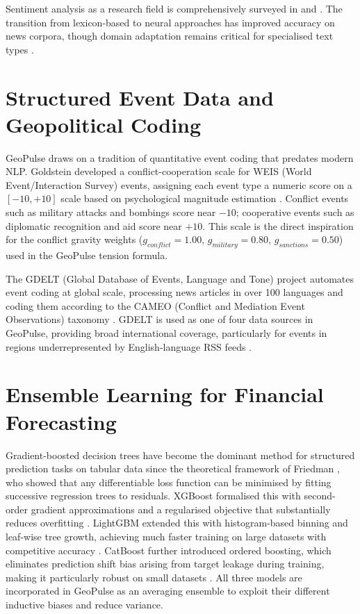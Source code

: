 \documentclass[12pt,a4paper]{report}
\begin{document}
Sentiment analysis as a research field is comprehensively surveyed in
\cite{pang2008} and \cite{liu2012}. The transition from lexicon-based to
neural approaches has improved accuracy on news corpora, though domain
adaptation remains critical for specialised text types \cite{araci2019}.

\section{Structured Event Data and Geopolitical Coding}

GeoPulse draws on a tradition of quantitative event coding that predates
modern NLP. Goldstein developed a conflict-cooperation scale for WEIS (World
Event/Interaction Survey) events, assigning each event type a numeric score
on a $[-10, +10]$ scale based on psychological magnitude estimation
\cite{goldstein1992}. Conflict events such as military attacks and bombings
score near $-10$; cooperative events such as diplomatic recognition and aid
score near $+10$. This scale is the direct inspiration for the conflict gravity
weights ($g_{conflict}=1.00$, $g_{military}=0.80$, $g_{sanctions}=0.50$) used
in the GeoPulse tension formula.

The GDELT (Global Database of Events, Language and Tone) project automates
event coding at global scale, processing news articles in over 100 languages
and coding them according to the CAMEO (Conflict and Mediation Event
Observations) taxonomy \cite{leetaru2013, schrodt2012}. GDELT is used as one
of four data sources in GeoPulse, providing broad international coverage,
particularly for events in regions underrepresented by English-language RSS
feeds \cite{leetaru2013}.

\section{Ensemble Learning for Financial Forecasting}

Gradient-boosted decision trees have become the dominant method for structured
prediction tasks on tabular data since the theoretical framework of Friedman
\cite{friedman2001}, who showed that any differentiable loss function can be
minimised by fitting successive regression trees to residuals. XGBoost
formalised this with second-order gradient approximations and a regularised
objective that substantially reduces overfitting \cite{chen2016}. LightGBM
extended this with histogram-based binning and leaf-wise tree growth, achieving
much faster training on large datasets with competitive accuracy \cite{ke2017}.
CatBoost further introduced ordered boosting, which eliminates prediction shift
bias arising from target leakage during training, making it particularly
robust on small datasets \cite{prokhorenkova2018}. All three models are
incorporated in GeoPulse as an averaging ensemble to exploit their different
inductive biases and reduce variance.
\end{document}
